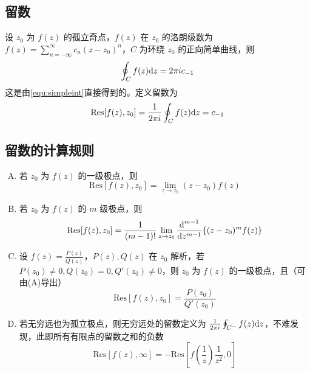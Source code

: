 \documentclass[./main.tex]{subfiles}
\begin{document}
\subsection{留数}
设 $z_0$ 为 $f(z)$ 的孤立奇点，$f(z)$ 在 $z_0$ 的洛朗级数为 $f(z)=\sum_{n=-\infty}^{\infty}c_n(z-z_0)^n$，$C$ 为环绕 $z_0$ 的正向简单曲线，则
\begin{equation}
    \oint_Cf(z)\text{d}z=2\pi ic_{-1}
\end{equation}
这是由\eqref{equ:simpleint}直接得到的。定义留数为
\begin{equation}
    \text{Res}[f(z),z_0]=\frac{1}{2\pi i}\oint_Cf(z)\text{d}z=c_{-1}
\end{equation}
\subsection{留数的计算规则}
\begin{enumerate}[(A)]
    \item 若 $z_0$ 为 $f(z)$ 的一级极点，则 $$\text{Res}[f(z),z_0]=\lim\limits_{z\rightarrow z_0}(z-z_0)f(z)$$
    \item 若 $z_0$ 为 $f(z)$ 的 $m$ 级极点，则
    \begin{equation}
        \text{Res}[f(z),z_0]=\frac{1}{(m-1)!}\lim\limits_{z\rightarrow z_0}\frac{\text{d}^{m-1}}{\text{d}z^{m-1}}\{(z-z_0)^mf(z)\}
    \end{equation}
    \item 设 $f(z)=\frac{P(z)}{Q(z)}$，$P(z),Q(z)$ 在 $z_0$ 解析，若 $P(z_0)\neq 0,Q(z_0)=0,Q'(z_0)\neq 0$，则 $z_0$ 为 $f(z)$ 的一级极点，且（可由(A)导出） $$\text{Res}[f(z),z_0]=\frac{P(z_0)}{Q'(z_0)}$$
    \item 若无穷远也为孤立极点，则无穷远处的留数定义为 $\frac{1}{2\pi i}\oint_{C^-}f(z)\text{d}z$，不难发现，此即所有有限点的留数之和的负数 \begin{equation}
        \text{Res}[f(z),\infty]=-\text{Res}\left[f\left(\frac{1}{z}\right)\frac{1}{z^2},0\right]
    \end{equation}
\end{enumerate}
\end{document}
